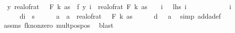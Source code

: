 \begin{isabellebody}
\ \ {\isacharbraceleft}{\kern0pt}y{\isachardot}{\kern0pt}\ real{\isacharunderscore}{\kern0pt}of{\isacharunderscore}{\kern0pt}rat\ {\isacharparenleft}{\kern0pt}{\isasymdelta}\ {\isacharasterisk}{\kern0pt}\ F\ k\ as{\isacharparenright}{\kern0pt}\ {\isacharless}{\kern0pt}\ {\isasymbar}f{}\ y\ i\ {\isacharminus}{\kern0pt}\ real{\isacharunderscore}{\kern0pt}of{\isacharunderscore}{\kern0pt}rat\ {\isacharparenleft}{\kern0pt}F\ k\ as{\isacharparenright}{\kern0pt}{\isasymbar}{\isacharbraceright}{\kern0pt}\ {\isasymle}\ {}{\isacharslash}{\kern0pt}{}{\isachardoublequoteclose}\ {\isacharparenleft}{\kern0pt}\ {\isachardoublequoteopen}{\isasymAnd}i{\isachardot}{\kern0pt}\ {\isacharunderscore}{\kern0pt}\ {\isasymLongrightarrow}\ {\isacharquery}{\kern0pt}lhs\ i\ {\isasymle}\ {\isacharunderscore}{\kern0pt}{\isachardoublequoteclose}{\isacharparenright}{\kern0pt}\isanewline
\ \ \isamarkupfalse%
\ {\isacharminus}{\kern0pt}\isanewline
\ \ \ \ \isamarkupfalse%
\ i\isanewline
\ \ \ \ \isamarkupfalse%
\ d{\isacharunderscore}{\kern0pt}{}{\isacharcolon}{\kern0pt}{\isachardoublequoteopen}i\ {\isacharless}{\kern0pt}\ s\isanewline
\ \ \ \ \isamarkupfalse%
\ a\ \ {\isachardoublequoteopen}a\ {\isacharequal}{\kern0pt}\ real{\isacharunderscore}{\kern0pt}of{\isacharunderscore}{\kern0pt}rat\ {\isacharparenleft}{\kern0pt}{\isasymdelta}\ {\isacharasterisk}{\kern0pt}\ F\ k\ as{\isacharparenright}{\kern0pt}{\isachardoublequoteclose}\isanewline
\ \ \ \ \isamarkupfalse%
\ d{\isacharunderscore}{\kern0pt}{}{\isacharcolon}{\kern0pt}\ {\isachardoublequoteopen}{}\ {\isacharless}{\kern0pt}\ a{\isachardoublequoteclose}\ \isamarkupfalse%
\ {\isacharparenleft}{\kern0pt}simp\ add{\isacharcolon}{\kern0pt}a{\isacharunderscore}{\kern0pt}def{\isacharparenright}{\kern0pt}\isanewline
\ \ \ \ \ \ \isamarkupfalse%
\ assms\ fk{\isacharunderscore}{\kern0pt}nonzero\ mult{\isacharunderscore}{\kern0pt}pos{\isacharunderscore}{\kern0pt}pos\ \isamarkupfalse%
\ blast\isanewline
\ \ \ \ \isamarkupfalse%

\end{isabellebody}
